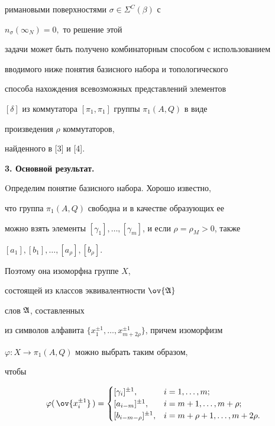 римановыми поверхностями $\sigma\in\Sigma^C(\beta)$ с


$n_\sigma(\infty_N)=0,$ то решение этой


задачи может быть получено комбинаторным способом с использованием


вводимого ниже понятия базисного набора и топологического


способа нахождения всевозможных представлений элементов


$[\delta]$ из коммутатора $[\pi_1,\pi_1]$ группы $\pi_1(A,Q)$ в виде


произведения $\rho$ коммутаторов,


найденного в [3] и [4].


\medskip





{\bf 3. Основной результат.}


Oпределим понятие базисного набора. Хорошо известно, 


что группа $\pi_1(A,Q)$ свободна и в качестве образующих ее


можно взять элементы $[\gamma_1],\dotsc


,[\gamma_m]$, и если $\rho=\rho_M>0$, также


$[a_1],[b_1],\dotsc,[a_\rho],[b_\rho]$.


Поэтому она изоморфна группе $X$,


состоящей из классов эквивалентности $\ov{\frak A}$


слов $\frak A$, составленных


из символов алфавита $\{x^{\pm 1}_1,\dotsc


,x^{\pm 1}_{m+2\rho} \}$, причем изоморфизм


$\varphi:X\to\pi_1(A,Q)$ можно выбрать таким образом,


чтобы


$$


\varphi(\,\ov{x^{\pm 1}_i}\,)=\begin{cases}


[\gamma_i]^{\pm 1},& i=1,\dotsc,m;\\


\lbrack a_{i-m}\rbrack ^{\pm 1},& i=m+1,\dotsc,m+\rho;\\


\lbrack b_{i-m-\rho}\rbrack ^{\pm 1},& i=m+\rho+1,\dotsc,m+2\rho.


\end{cases}


$$



